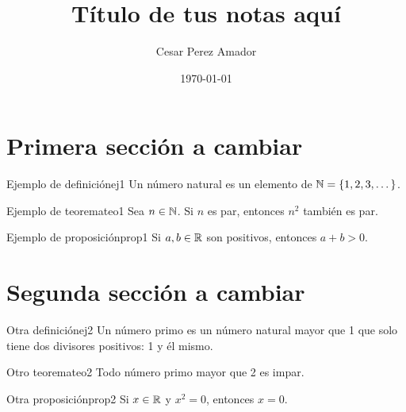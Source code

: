 \documentclass[12pt,a4paper]{article}
\title{Título de tus notas aquí}
\author{Cesar Perez Amador}
\date{\today}
\begin{document}
\maketitle

\section{Primera sección a cambiar}

\begin{definicion}{Ejemplo de definición}{ej1}
Un número natural es un elemento de $\mathbb{N} = \{1, 2, 3, \dots\}$.
\end{definicion}

\begin{teorema}{Ejemplo de teorema}{teo1}
Sea $n \in \mathbb{N}$. Si $n$ es par, entonces $n^2$ también es par.
\end{teorema}

\begin{proposicion}{Ejemplo de proposición}{prop1}
Si $a,b \in \mathbb{R}$ son positivos, entonces $a+b>0$.
\end{proposicion}

\section{Segunda sección a cambiar}

\begin{definicion}{Otra definición}{ej2}
Un número primo es un número natural mayor que 1 que solo tiene dos divisores positivos: 1 y él mismo.
\end{definicion}

\begin{teorema}{Otro teorema}{teo2}
Todo número primo mayor que 2 es impar.
\end{teorema}

\begin{proposicion}{Otra proposición}{prop2}
Si $x \in \mathbb{R}$ y $x^2 = 0$, entonces $x=0$.
\end{proposicion}
\end{document}

